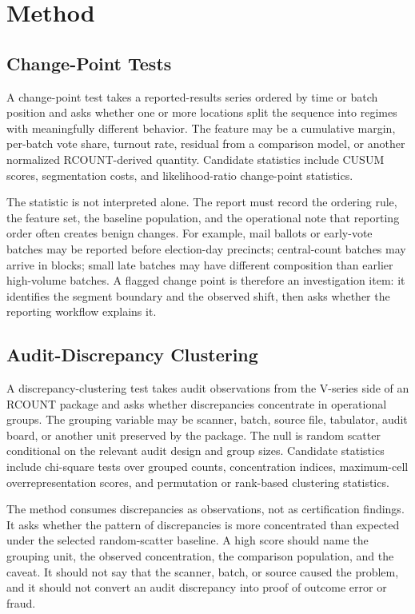 \section{Method}

\subsection{Change-Point Tests}

A change-point test takes a reported-results series ordered by time or batch
position and asks whether one or more locations split the sequence into regimes
with meaningfully different behavior. The feature may be a cumulative margin,
per-batch vote share, turnout rate, residual from a comparison model, or another
normalized RCOUNT-derived quantity. Candidate statistics include CUSUM scores,
segmentation costs, and likelihood-ratio change-point statistics.

The statistic is not interpreted alone. The report must record the ordering
rule, the feature set, the baseline population, and the operational note that
reporting order often creates benign changes. For example, mail ballots or
early-vote batches may be reported before election-day precincts; central-count
batches may arrive in blocks; small late batches may have different composition
than earlier high-volume batches. A flagged change point is therefore an
investigation item: it identifies the segment boundary and the observed shift,
then asks whether the reporting workflow explains it.

\subsection{Audit-Discrepancy Clustering}

A discrepancy-clustering test takes audit observations from the V-series side of
an RCOUNT package and asks whether discrepancies concentrate in operational
groups. The grouping variable may be scanner, batch, source file, tabulator,
audit board, or another unit preserved by the package.
The null is random scatter conditional on the relevant audit design and group
sizes. Candidate statistics include chi-square tests over grouped counts,
concentration indices, maximum-cell overrepresentation scores, and permutation
or rank-based clustering statistics.

The method consumes discrepancies as observations, not as certification
findings. It asks whether the pattern of discrepancies is more concentrated
than expected under the selected random-scatter baseline. A high score should
name the grouping unit, the observed concentration, the comparison population,
and the caveat. It should not say that the scanner, batch, or source caused the
problem, and it should not convert an audit discrepancy into proof of outcome
error or fraud.
